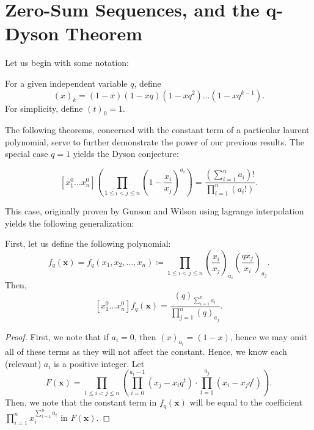 \chapter{Zero-Sum Sequences, and the q-Dyson Theorem}
Let us begin with some notation:
\begin{notation}[Subpower]
	For a given independent variable $q$, define \[
		\left( x \right) _{k} = \left( 1-x \right) \left(  1-xq \right) \left( 1-xq^2 \right) \ldots \left( 1-xq^{k-1} \right)
	.\] 	For simplicity, define $\left( t \right) _{0} = 1$.
\end{notation}
The following theorems, concerned with the constant term of a particular laurent polynomial, serve to further demonstrate the power of our previous results. The special case $q=1$ yields the Dyson conjecture:
\begin{theorem}
	\[
		[x_1^{0}\ldots x_{n}^{0}]\left( \prod_{1\le i < j \le n}^{}  \left( 1- \frac{x_{i}}{x_{j}} \right)^{a_{i}}  \right)  = \frac{\left( \sum_{i= 1}^{n} a_{i} \right) ! }{\prod_{i= 1}^{n} \left( a_{i}! \right)}
	.\]
\end{theorem}
This case, originally proven by Gunson and Wilson using lagrange interpolation yields the following generalization:
\begin{theorem}
	First, let us define the following polynomial:
	\[
		f_{q}\left( \textbf{x} \right) = f_{q}\left( x_1, x_2, \ldots, x_{n} \right) \coloneqq \prod_{1\le i < j \le n}^{} \left( \frac{x_{i}}{x_{j}} \right) _{a_{i}} \left( \frac{qx_{j}}{x_{i}} \right) _{a_{j}}
	.\]
	Then,  \[
		[x_1^{0}\ldots x_{n}^{0}]f_{q}\left( \textbf{x} \right)  = \frac{\left( q \right) _{\sum_{i= 1}^{n} a_{i}}}{\prod_{j= 1}^{n} \left( q \right) _{a_{j}}}
	.\]
\end{theorem}
\begin{proof}
	First, we note that if \(a_{i} = 0\), then \(\left( x \right) _{a_{i}} = \left( 1-x \right) \), hence we may omit all of these terms as they will not affect the constant. Hence, we know each (relevant) \(a_{i}\) is a positive integer. Let \[
		F\left( \textbf{x} \right) = \prod_{1 \le i < j \le n}^{} \left( \prod_{i=0}^{a_{i} - 1} \left( x_{j} - x_{i}q^{t} \right) \cdot \prod_{t=1}^{a_{j}} \left( x_{i} - x_{j}q^{t} \right)  \right)
	.\]
	Then, we note that the constant term in \(f_{q} \left( \textbf{x} \right) \) will be equal to the coefficient \(\prod_{i= 1}^{n} x_{i}^{\sum_{i= 1}^{n} a_{i}}\) in \(F\left( \textbf{x} \right) \).
\end{proof}
